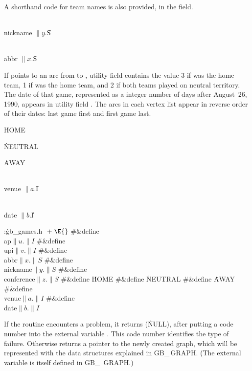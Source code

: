 A shorthand code for team names is also provided, in the  field.

\Y\B\4\D\\{nickname}\5
$\|y.{}$\|S\par
\B\4\D\\{abbr}\5
$\|x.{}$\|S\par
\fi

If  points to an arc from  to , utility field %
 contains
the value 3 if  was the home team, 1 if  was the home team, and
2 if both
teams played on neutral territory. The date of that game, represented
as a integer number of days after August~26, 1990, appears in utility
field . The arcs in each vertex list 
appear in reverse order
of their dates: last game first and first game last.

\Y\B\4\D\.{HOME}\5
\par
\B\4\D\.{NEUTRAL}\5
\par
\B\4\D\.{AWAY}\5
\par
\B\4\D\\{venue}\5
$\|a.{}$\|I\par
\B\4\D\\{date}\5
$\|b.{}$\|I\par
\Y\B\4:\.{gb\_games.h }\X${}\mathrel+\E{}$\6
\8\#\&{define} \\{ap}\5${}\|u.\|I{}$\6
\8\#\&{define} \\{upi}\5${}\|v.\|I{}$\6
\8\#\&{define} \\{abbr}\5${}\|x.\|S{}$\6
\8\#\&{define} \\{nickname}\5${}\|y.\|S{}$\6
\8\#\&{define} \\{conference}\5${}\|z.\|S{}$\6
\8\#\&{define} \.{HOME}\5\6
\8\#\&{define} \.{NEUTRAL}\5\6
\8\#\&{define} \.{AWAY}\5\6
\8\#\&{define} \\{venue}\5${}\|a.\|I{}$\6
\8\#\&{define} \\{date}\5${}\|b.\|I{}$\par
\fi

If the  routine encounters a problem, it returns \PB{$%
\NULL$}
(\.{NULL}), after putting a code number into the external variable
. This code number identifies the type of failure.
Otherwise  returns a pointer to the newly created graph, which
will be represented with the data structures explained in {\sc GB\_\,GRAPH}.
(The external variable  is itself defined in {\sc GB\_%
\,GRAPH}.)

